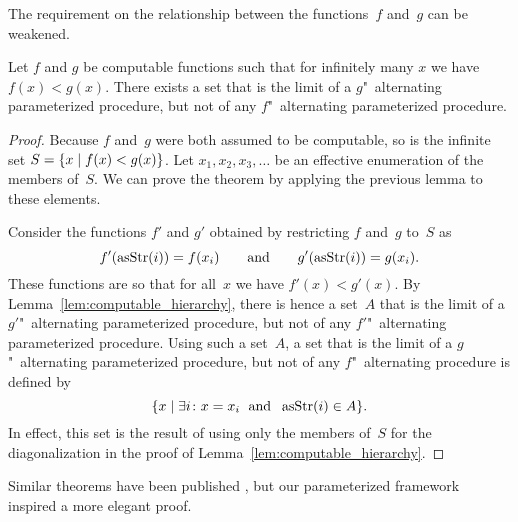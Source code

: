 The requirement on the relationship between the functions~$f$ and~$g$ can be weakened.
\begin{theorem}
\label{thm:computable_hierarchy}%
  Let $f$ and $g$ be computable functions such that for infinitely many $x$ we have $f(x) < g(x)$.
  There exists a set that is the limit of a $g$"~alternating parameterized procedure, but not of any $f$"~alternating parameterized procedure.
\end{theorem}
\begin{proof}
  Because $f$ and~$g$ were both assumed to be computable, so is the infinite set $S = \{x \;|\; f(x) < g(x)\}$.
  Let $x_1, x_2, x_3, \ldots$ be an effective enumeration of the members of~$S$.
  We can prove the theorem by applying the previous lemma to these elements.

  Consider the functions $f'$ and $g'$ obtained by restricting $f$ and~$g$ to~$S$ as
  \begin{equation*}
    f'(\operatorname{asStr}(i)) = f(x_i) \qquad\text{and}\qquad g'(\operatorname{asStr}(i)) = g(x_i).
  \end{equation*}
  These functions are so that for all~$x$ we have $f'(x) < g'(x)$.
  By Lemma~\ref{lem:computable_hierarchy}, there is hence a set~$A$ that is the limit of a $g'$"~alternating parameterized procedure, but not of any $f'$"~alternating parameterized procedure.
  Using such a set~$A$, a set that is the limit of a $g$"~alternating parameterized procedure, but not of any $f$"~alternating procedure is defined by
  \begin{equation*}
    \{x \;|\; \exists i\colon x = x_i\;\text{ and }\;\operatorname{asStr}(i) \in A\}.
  \end{equation*}
  In effect, this set is the result of using only the members of~$S$ for the diagonalization in the proof of Lemma~\ref{lem:computable_hierarchy}.
\end{proof}

Similar theorems have been published \parencite{epstein1981hierarchies,arslanov1997degree}, but our parameterized framework inspired a more elegant proof.

